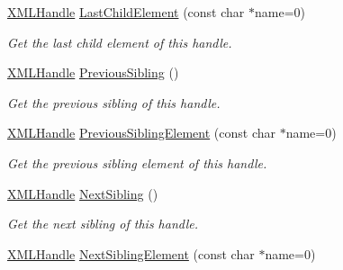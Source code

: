 \begin{DoxyCompactItemize}
\mbox{\hyperlink{classtinyxml2_1_1_x_m_l_handle}{X\+M\+L\+Handle}} \mbox{\hyperlink{classtinyxml2_1_1_x_m_l_handle_a42cccd0ce8b1ce704f431025e9f19e0c}{Last\+Child\+Element}} (const char $\ast$name=0)
\begin{DoxyCompactList}\small\item\em Get the last child element of this handle. \end{DoxyCompactList}\item 
\mbox{\label{classtinyxml2_1_1_x_m_l_handle_a428374e756f4db4cbc287fec64eae02c}} 
\mbox{\hyperlink{classtinyxml2_1_1_x_m_l_handle}{X\+M\+L\+Handle}} \mbox{\hyperlink{classtinyxml2_1_1_x_m_l_handle_a428374e756f4db4cbc287fec64eae02c}{Previous\+Sibling}} ()
\begin{DoxyCompactList}\small\item\em Get the previous sibling of this handle. \end{DoxyCompactList}\item 
\mbox{\label{classtinyxml2_1_1_x_m_l_handle_a786957e498039554ed334cdc36612a7e}} 
\mbox{\hyperlink{classtinyxml2_1_1_x_m_l_handle}{X\+M\+L\+Handle}} \mbox{\hyperlink{classtinyxml2_1_1_x_m_l_handle_a786957e498039554ed334cdc36612a7e}{Previous\+Sibling\+Element}} (const char $\ast$name=0)
\begin{DoxyCompactList}\small\item\em Get the previous sibling element of this handle. \end{DoxyCompactList}\item 
\mbox{\label{classtinyxml2_1_1_x_m_l_handle_aad2eccc7c7c7b18145877c978c3850b5}} 
\mbox{\hyperlink{classtinyxml2_1_1_x_m_l_handle}{X\+M\+L\+Handle}} \mbox{\hyperlink{classtinyxml2_1_1_x_m_l_handle_aad2eccc7c7c7b18145877c978c3850b5}{Next\+Sibling}} ()
\begin{DoxyCompactList}\small\item\em Get the next sibling of this handle. \end{DoxyCompactList}\item 
\mbox{\label{classtinyxml2_1_1_x_m_l_handle_ae41d88ee061f3c49a081630ff753b2c5}} 
\mbox{\hyperlink{classtinyxml2_1_1_x_m_l_handle}{X\+M\+L\+Handle}} \mbox{\hyperlink{classtinyxml2_1_1_x_m_l_handle_ae41d88ee061f3c49a081630ff753b2c5}{Next\+Sibling\+Element}} (const char $\ast$name=0)

\end{DoxyCompactItemize}
